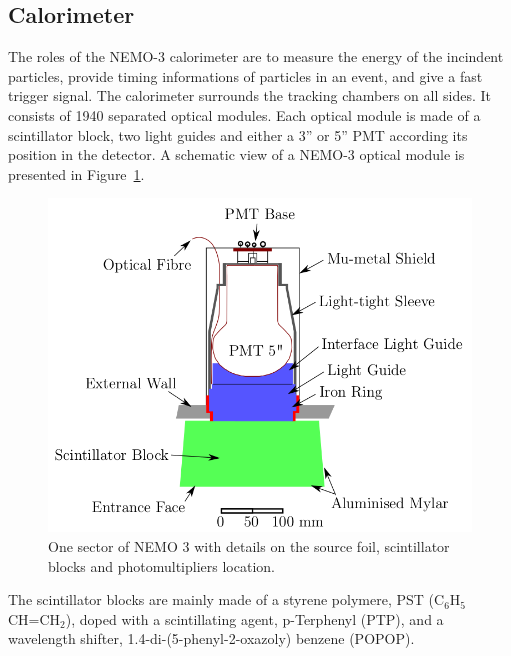 \documentclass[main.tex]{subfiles}
\begin{document}
\subsection{Calorimeter}


\NI The roles of the NEMO-3 calorimeter are to measure the energy of the incindent particles, provide timing informations of particles in an event, and give a fast trigger signal. The calorimeter surrounds the tracking chambers on all sides. It consists of 1940 separated optical modules. Each optical module is made of a scintillator block, two light guides and either a 3'' or 5'' PMT according its position in the detector. A schematic view of a NEMO-3 optical module is presented in Figure~\ref{CaloModuleNEMO3}.	


\begin{figure}[h!]
\begin{center}
\includegraphics[scale=0.34]{pictures/Chap3/CaloModuleNEMO3.png}
\caption{One sector of NEMO 3 with details on the source foil, scintillator blocks and photomultipliers location.}
\label{CaloModuleNEMO3}
\end{center}
\end{figure}


\NI The scintillator blocks are mainly made of a styrene polymere, PST (C$_\text{6}$H$_\text{5}$CH=CH$_\text{2}$), doped with a scintillating agent, p-Terphenyl (PTP), and a wavelength shifter, 1.4-di-(5-phenyl-2-oxazoly) benzene (POPOP).  
\end{document}
